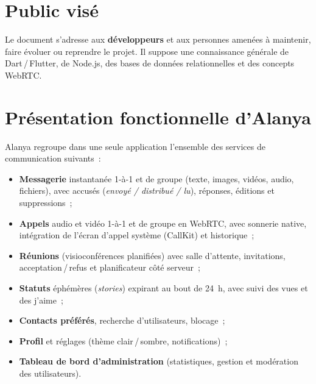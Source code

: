 \documentclass[11pt,a4paper,oneside]{report}
\begin{document}
\section{Public vis\'{e}}
Le document s'adresse aux \textbf{d\'{e}veloppeurs} et aux personnes amen\'{e}es \`{a}
maintenir, faire \'{e}voluer ou reprendre le projet. Il suppose une connaissance
g\'{e}n\'{e}rale de Dart\,/\,Flutter, de Node.js, des bases de donn\'{e}es relationnelles
et des concepts WebRTC.

\section{Pr\'{e}sentation fonctionnelle d'Alanya}
Alanya regroupe dans une seule application l'ensemble des services de
communication suivants~:
\begin{itemize}[leftmargin=1.3em]
  \item \textbf{Messagerie} instantan\'{e}e 1-\`{a}-1 et de groupe (texte, images,
        vid\'{e}os, audio, fichiers), avec accus\'{e}s (\emph{envoy\'{e} / distribu\'{e} / lu}),
        r\'{e}ponses, \'{e}ditions et suppressions~;
  \item \textbf{Appels} audio et vid\'{e}o 1-\`{a}-1 et de groupe en WebRTC, avec
        sonnerie native, int\'{e}gration de l'\'{e}cran d'appel syst\`{e}me (CallKit)
        et historique~;
  \item \textbf{R\'{e}unions} (visioconf\'{e}rences planifi\'{e}es) avec salle d'attente,
        invitations, acceptation\,/\,refus et planificateur c\^{o}t\'{e} serveur~;
  \item \textbf{Statuts} \'{e}ph\'{e}m\`{e}res (\emph{stories}) expirant au bout de 24~h,
        avec suivi des vues et des \og{}j'aime\fg{}~;
  \item \textbf{Contacts pr\'{e}f\'{e}r\'{e}s}, recherche d'utilisateurs, blocage~;
  \item \textbf{Profil} et r\'{e}glages (th\`{e}me clair\,/\,sombre, notifications)~;
  \item \textbf{Tableau de bord d'administration} (statistiques, gestion et
        mod\'{e}ration des utilisateurs).
\end{itemize}
\end{document}
